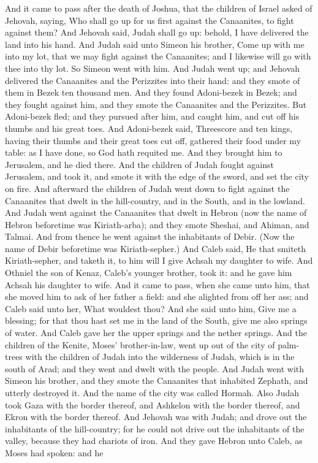 


And it came to pass after the death of Joshua, that the children of Israel asked of Jehovah, saying, Who shall go up for us first against the Canaanites, to fight against them? And Jehovah said, Judah shall go up: behold, I have delivered the land into his hand. And Judah said unto Simeon his brother, Come up with me into my lot, that we may fight against the Canaanites; and I likewise will go with thee into thy lot. So Simeon went with him. And Judah went up; and Jehovah delivered the Canaanites and the Perizzites into their hand: and they smote of them in Bezek ten thousand men. And they found Adoni-bezek in Bezek; and they fought against him, and they smote the Canaanites and the Perizzites. But Adoni-bezek fled; and they pursued after him, and caught him, and cut off his thumbs and his great toes. And Adoni-bezek said, Threescore and ten kings, having their thumbs and their great toes cut off, gathered their food under my table: as I have done, so God hath requited me. And they brought him to Jerusalem, and he died there.  And the children of Judah fought against Jerusalem, and took it, and smote it with the edge of the sword, and set the city on fire. And afterward the children of Judah went down to fight against the Canaanites that dwelt in the hill-country, and in the South, and in the lowland. And Judah went against the Canaanites that dwelt in Hebron (now the name of Hebron beforetime was Kiriath-arba); and they smote Sheshai, and Ahiman, and Talmai.  And from thence he went against the inhabitants of Debir. (Now the name of Debir beforetime was Kiriath-sepher.) And Caleb said, He that smiteth Kiriath-sepher, and taketh it, to him will I give Achsah my daughter to wife. And Othniel the son of Kenaz, Caleb’s younger brother, took it: and he gave him Achsah his daughter to wife. And it came to pass, when she came unto him, that she moved him to ask of her father a field: and she alighted from off her ass; and Caleb said unto her, What wouldest thou? And she said unto him, Give me a blessing; for that thou hast set me in the land of the South, give me also springs of water. And Caleb gave her the upper springs and the nether springs.  And the children of the Kenite, Moses’ brother-in-law, went up out of the city of palm-trees with the children of Judah into the wilderness of Judah, which is in the south of Arad; and they went and dwelt with the people. And Judah went with Simeon his brother, and they smote the Canaanites that inhabited Zephath, and utterly destroyed it. And the name of the city was called Hormah. Also Judah took Gaza with the border thereof, and Ashkelon with the border thereof, and Ekron with the border thereof. And Jehovah was with Judah; and drove out the inhabitants of the hill-country; for he could not drive out the inhabitants of the valley, because they had chariots of iron. And they gave Hebron unto Caleb, as Moses had spoken: and he 